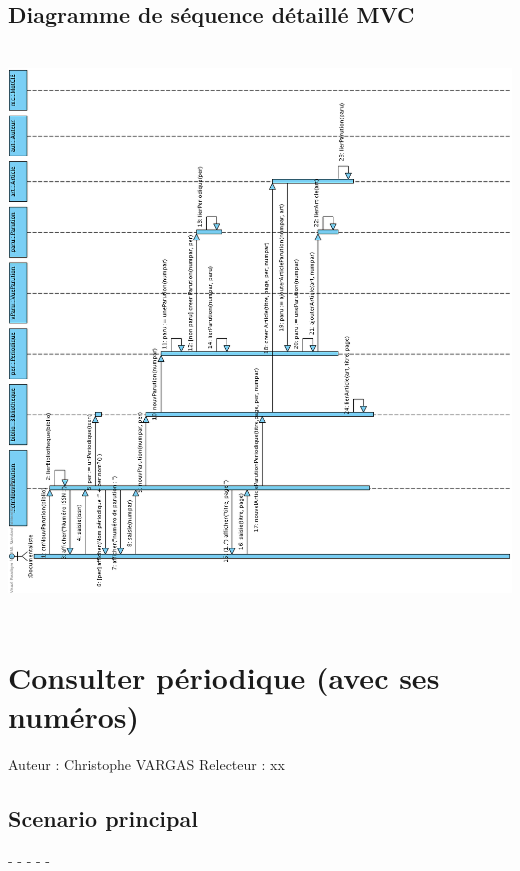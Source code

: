 \documentclass[a4paper,10pt]{report}
\begin{document}
\section*{Diagramme de séquence détaillé MVC}
\includegraphics[height=150mm]{NouvNumPerMVC.png}

\newpage


\chapter*{Consulter périodique (avec ses numéros)}

Auteur : Christophe VARGAS
Relecteur : xx

\bigskip
\section*{Scenario principal}
\begin{flushleft}
-
-
-
-
-
\end{flushleft}
\end{document}

